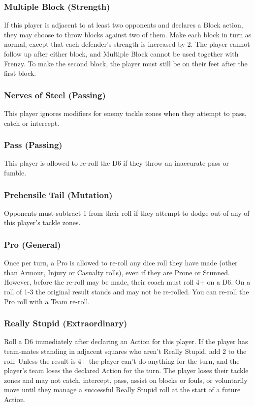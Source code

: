 \begin{multicols}{3}
\subsubsection{Multiple Block (Strength)}
\par If this player is adjacent to at least two opponents and declares a Block action, they may choose to throw blocks against two of them. Make each block in turn as normal, except that each defender's strength is increased by 2. The player cannot follow up after either block, and Multiple Block cannot be used together with Frenzy. To make the second block, the player must still be on their feet after the first block.

\subsubsection{Nerves of Steel (Passing)}
\par This player ignores modifiers for enemy tackle zones when they attempt to pass, catch or intercept.

\subsubsection{Pass (Passing)}
\par This player is allowed to re-roll the D6 if they throw an inaccurate pass or fumble.

\subsubsection{Prehensile Tail (Mutation)}
\par Opponents must subtract 1 from their roll if they attempt to dodge out of any of this player's tackle zones.

\subsubsection{Pro (General)}
\par Once per turn, a Pro is allowed to re-roll any dice roll they have made (other than Armour, Injury or Casualty rolls), even if they are Prone or Stunned. However, before the re-roll may be made, their coach must roll 4+ on a D6. On a roll of 1-3 the original result stands and may not be re-rolled. You can re-roll the Pro roll with a Team re-roll.

\subsubsection{Really Stupid (Extraordinary)}
\par Roll a D6 immediately after declaring an Action for this player. If the player has team-mates standing in adjacent squares who aren't Really Stupid, add 2 to the roll. Unless the result is 4+ the player can't do anything for the turn, and the player's team loses the declared Action for the turn. The player loses their tackle zones and may not catch, intercept, pass, assist on blocks or fouls, or voluntarily move until they manage a successful Really Stupid roll at the start of a future Action.


\end{multicols}
